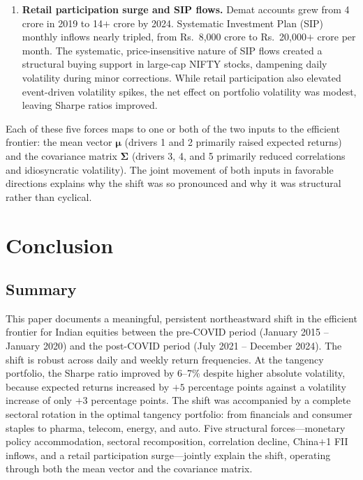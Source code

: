 \documentclass[12pt,a4paper]{article}
\begin{document}
\begin{enumerate}
    \item \textbf{Retail participation surge and SIP flows.} Demat accounts grew from
        4 crore in 2019 to 14$+$ crore by 2024. Systematic Investment Plan (SIP)
        monthly inflows nearly tripled, from Rs.\ 8,000 crore to Rs.\ 20,000$+$ crore
        per month. The systematic, price-insensitive nature of SIP flows created a
        structural buying support in large-cap NIFTY stocks, dampening daily
        volatility during minor corrections. While retail participation also elevated
        event-driven volatility spikes, the net effect on portfolio volatility was
        modest, leaving Sharpe ratios improved.
\end{enumerate}

Each of these five forces maps to one or both of the two inputs to the efficient
frontier: the mean vector $\boldsymbol{\mu}$ (drivers 1 and 2 primarily raised expected
returns) and the covariance matrix $\boldsymbol{\Sigma}$ (drivers 3, 4, and 5 primarily
reduced correlations and idiosyncratic volatility). The joint movement of both inputs
in favorable directions explains why the shift was so pronounced and why it was
structural rather than cyclical.

\section{Conclusion}
\label{sec:conclusion}

\subsection{Summary}

This paper documents a meaningful, persistent northeastward shift in the efficient
frontier for Indian equities between the pre-COVID period (January 2015 -- January 2020)
and the post-COVID period (July 2021 -- December 2024). The shift is robust across daily
and weekly return frequencies. At the tangency portfolio, the Sharpe ratio improved by
6--7\% despite higher absolute volatility, because expected returns increased by $+5$
percentage points against a volatility increase of only $+3$ percentage points. The
shift was accompanied by a complete sectoral rotation in the optimal tangency portfolio:
from financials and consumer staples to pharma, telecom, energy, and auto. Five
structural forces---monetary policy accommodation, sectoral recomposition, correlation
decline, China$+$1 FII inflows, and a retail participation surge---jointly explain the
shift, operating through both the mean vector and the covariance matrix.
\end{document}
